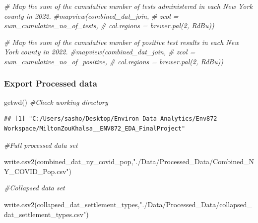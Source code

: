 \documentclass[
  12pt,
]{article}
\newenvironment{Shaded}{\begin{snugshade}}{\end{snugshade}}
\newcommand{\CommentTok}[1]{\textcolor[rgb]{0.56,0.35,0.01}{\textit{#1}}}
\newcommand{\FunctionTok}[1]{\textcolor[rgb]{0.00,0.00,0.00}{#1}}
\newcommand{\NormalTok}[1]{#1}
\newcommand{\StringTok}[1]{\textcolor[rgb]{0.31,0.60,0.02}{#1}}
\begin{document}
\begin{Shaded}
\begin{Highlighting}[]
\CommentTok{\# Map the sum of the cumulative number of tests administered in each New York county in 2022.}
\CommentTok{\#mapview(combined\_dat\_join, }
      \CommentTok{\#  zcol = \textquotesingle{}sum\_cumulative\_no\_of\_tests\textquotesingle{}, }
       \CommentTok{\# col.regions = brewer.pal(2, \textquotesingle{}RdBu\textquotesingle{}))}

\CommentTok{\# Map the sum of the cumulative number of positive test results in each New York county in 2022.}
\CommentTok{\#mapview(combined\_dat\_join, }
      \CommentTok{\#  zcol = \textquotesingle{}sum\_cumulative\_no\_of\_positive\textquotesingle{}, }
      \CommentTok{\#  col.regions = brewer.pal(2, \textquotesingle{}RdBu\textquotesingle{}))}
\end{Highlighting}
\end{Shaded}

\hypertarget{export-processed-data}{%
\subsubsection{Export Processed data}\label{export-processed-data}}

\begin{Shaded}
\begin{Highlighting}[]
\FunctionTok{getwd}\NormalTok{() }\CommentTok{\#Check working directory}
\end{Highlighting}
\end{Shaded}

\begin{verbatim}
## [1] "C:/Users/sasho/Desktop/Environ Data Analytics/Env872 Workspace/MiltonZouKhalsa__ENV872_EDA_FinalProject"
\end{verbatim}

\begin{Shaded}
\begin{Highlighting}[]
\CommentTok{\#Full processed data set}

\FunctionTok{write.csv2}\NormalTok{(combined\_dat\_ny\_covid\_pop,}\StringTok{"./Data/Processed\_Data/Combined\_NY\_COVID\_Pop.csv"}\NormalTok{)}

\CommentTok{\#Collapsed data set}

\FunctionTok{write.csv2}\NormalTok{(collapsed\_dat\_settlement\_types,}\StringTok{"./Data/Processed\_Data/collapsed\_dat\_settlement\_types.csv"}\NormalTok{)}
\end{Highlighting}
\end{Shaded}

\newpage
\end{document}
